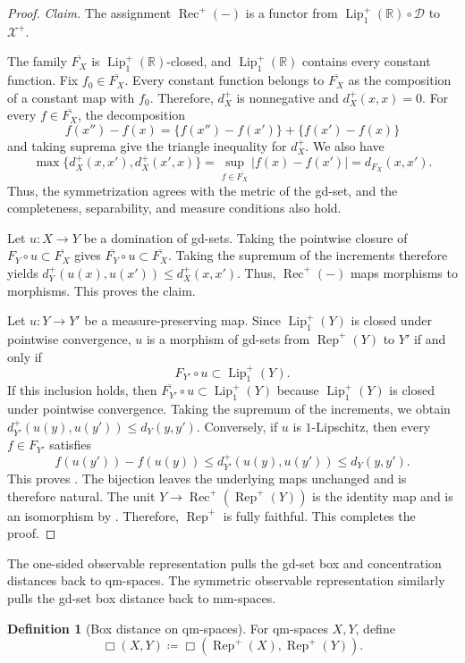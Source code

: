 \documentclass{amsart}
\theoremstyle{plain}
\theoremstyle{definition}
\newtheorem{definition}[theorem]{Definition}
\theoremstyle{remark}
\newcommand{\R}{\mathbb{R}}
\newcommand{\D}{\mathcal{D}}
\newcommand{\Xp}{\mathcal{X}^{+}}
\newcommand{\Lup}{\operatorname{Lip}^{+}_{1}(\R)}
\newcommand{\lipplus}{\operatorname{Lip}^{+}_{1}}
\begin{document}
\begin{proof}
\emph{Claim.} The assignment $\operatorname{Rec}^{+}(-)$ is a functor from $\Lup\circ\D$ to $\Xp$.

The family $\overline{F_X}$ is $\Lup$-closed, and $\Lup$ contains every constant function. Fix $f_0\in\overline{F_X}$. Every constant function belongs to $\overline{F_X}$ as the composition of a constant map with $f_0$. Therefore, $d_X^+$ is nonnegative and $d_X^+(x,x)=0$. For every $f\in\overline{F_X}$, the decomposition
\[f(x'')-f(x)=\{f(x'')-f(x')\}+\{f(x')-f(x)\}\]
and taking suprema give the triangle inequality for $d_X^+$. We also have
\[\max\{d_X^+(x,x'),d_X^+(x',x)\}=\sup_{f\in\overline{F_X}}|f(x)-f(x')|=d_{F_X}(x,x').\]
Thus, the symmetrization agrees with the metric of the gd-set, and the completeness, separability, and measure conditions also hold.

Let $u\colon X\to Y$ be a domination of gd-sets. Taking the pointwise closure of $F_Y\circ u\subset\overline{F_X}$ gives $\overline{F_Y}\circ u\subset\overline{F_X}$. Taking the supremum of the increments therefore yields $d_Y^+(u(x),u(x'))\leq d_X^+(x,x')$. Thus, $\operatorname{Rec}^{+}(-)$ maps morphisms to morphisms.
This proves the claim.

Let $u\colon Y\to Y'$ be a measure-preserving map. Since $\lipplus(Y)$ is closed under pointwise convergence, $u$ is a morphism of gd-sets from $\operatorname{Rep}^{+}(Y)$ to $Y'$ if and only if
\[F_{Y'}\circ u\subset\lipplus(Y).\]
If this inclusion holds, then $\overline{F_{Y'}}\circ u\subset\lipplus(Y)$ because $\lipplus(Y)$ is closed under pointwise convergence. Taking the supremum of the increments, we obtain $d_{Y'}^+(u(y),u(y'))\leq d_Y(y,y')$. Conversely, if $u$ is $1$-Lipschitz, then every $f\in F_{Y'}$ satisfies
\[f(u(y'))-f(u(y))\leq d_{Y'}^+(u(y),u(y'))\leq d_Y(y,y').\]
This proves . The bijection leaves the underlying maps unchanged and is therefore natural. The unit $Y\to\operatorname{Rec}^{+}(\operatorname{Rep}^{+}(Y))$ is the identity map and is an isomorphism by . Therefore, $\operatorname{Rep}^{+}$ is fully faithful.
This completes the proof.
\end{proof}

The one-sided observable representation pulls the gd-set box and concentration distances back to qm-spaces. The symmetric observable representation similarly pulls the gd-set box distance back to mm-spaces.

\begin{definition}[Box distance on qm-spaces]
\label{def:pullback-distances}
For qm-spaces $X,Y$, define
\[\Box(X,Y)\coloneqq\Box(\operatorname{Rep}^{+}(X),\operatorname{Rep}^{+}(Y)).\]
\end{definition}
\end{document}
